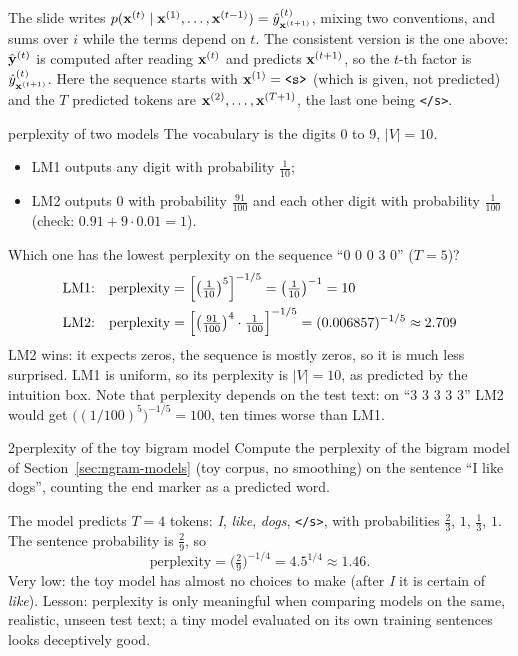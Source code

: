 \begin{nbwarning}
The slide writes $p(\mathbf{x}^{(t)} \mid \mathbf{x}^{(1)}, \ldots, \mathbf{x}^{(t-1)}) =
\hat y^{(t)}_{\mathbf{x}^{(t+1)}}$, mixing two conventions, and sums over $i$ while the
terms depend on $t$. The consistent version is the one above: $\hat{\mathbf{y}}^{(t)}$ is
computed after reading $\mathbf{x}^{(t)}$ and predicts $\mathbf{x}^{(t+1)}$, so the $t$-th
factor is $\hat y^{(t)}_{\mathbf{x}^{(t+1)}}$. Here the sequence starts with
$\mathbf{x}^{(1)} = \texttt{<s>}$ (which is given, not predicted) and the $T$ predicted
tokens are $\mathbf{x}^{(2)}, \ldots, \mathbf{x}^{(T+1)}$, the last one being \texttt{</s>}.
\end{nbwarning}

\begin{nbexample}{perplexity of two models}
The vocabulary is the digits 0 to 9, $|V| = 10$.
\begin{itemize}[nosep]
  \item LM1 outputs any digit with probability $\frac{1}{10}$;
  \item LM2 outputs 0 with probability $\frac{91}{100}$ and each other digit with
        probability $\frac{1}{100}$ (check: $0.91 + 9 \cdot 0.01 = 1$).
\end{itemize}
Which one has the lowest perplexity on the sequence ``0 0 0 3 0'' ($T = 5$)?
\begin{align*}
  \text{LM1:}\quad \text{perplexity} &= \Bigl[\bigl(\tfrac{1}{10}\bigr)^5\Bigr]^{-1/5}
     = \bigl(\tfrac{1}{10}\bigr)^{-1} = 10 \\
  \text{LM2:}\quad \text{perplexity} &= \Bigl[\bigl(\tfrac{91}{100}\bigr)^4 \cdot
     \tfrac{1}{100}\Bigr]^{-1/5} = (0.006857)^{-1/5} \approx 2.709
\end{align*}
LM2 wins: it expects zeros, the sequence is mostly zeros, so it is much less surprised.
LM1 is uniform, so its perplexity is $|V| = 10$, as predicted by the intuition box.
Note that perplexity depends on the test text: on ``3 3 3 3 3'' LM2 would get
$\bigl((1/100)^5\bigr)^{-1/5} = 100$, ten times worse than LM1.
\end{nbexample}

\begin{nbexercise}{2}{perplexity of the toy bigram model}
\notinslides
Compute the perplexity of the bigram model of Section~\ref{sec:ngram-models} (toy
corpus, no smoothing) on the sentence ``I like dogs'', counting the end marker as a
predicted word.
\end{nbexercise}
\begin{nbsolution}
The model predicts $T = 4$ tokens: \emph{I}, \emph{like}, \emph{dogs}, \texttt{</s>},
with probabilities $\frac23$, $1$, $\frac13$, $1$. The sentence probability is
$\frac29$, so
\[
  \text{perplexity} = \bigl(\tfrac29\bigr)^{-1/4} = 4.5^{1/4} \approx 1.46 .
\]
Very low: the toy model has almost no choices to make (after \emph{I} it is certain of
\emph{like}). Lesson: perplexity is only meaningful when comparing models on the
same, realistic, unseen test text; a tiny model evaluated on its own training sentences
looks deceptively good.
\end{nbsolution}

